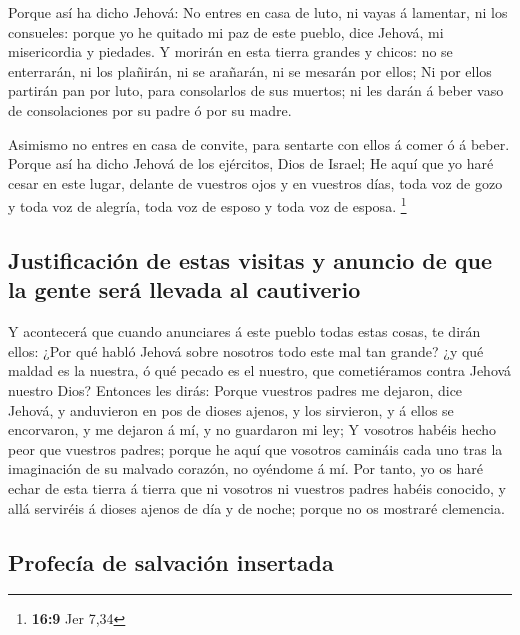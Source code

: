  Porque así ha dicho Jehová: No entres en casa de luto, ni
vayas á lamentar, ni los consueles: porque yo he quitado mi paz de este
pueblo, dice Jehová, mi misericordia y piedades.  Y morirán
en esta tierra grandes y chicos: no se enterrarán, ni los plañirán, ni
se arañarán, ni se mesarán por ellos;  Ni por ellos partirán
pan por luto, para consolarlos de sus muertos; ni les darán á beber vaso
de consolaciones por su padre ó por su madre.

 Asimismo no entres en casa de convite, para sentarte con
ellos á comer ó á beber.  Porque así ha dicho Jehová de los
ejércitos, Dios de Israel; He aquí que yo haré cesar en este lugar,
delante de vuestros ojos y en vuestros días, toda voz de gozo y toda voz
de alegría, toda voz de esposo y toda voz de esposa. \footnote{\textbf{16:9}
  Jer 7,34}

\hypertarget{justificaciuxf3n-de-estas-visitas-y-anuncio-de-que-la-gente-seruxe1-llevada-al-cautiverio}{%
\subsection{Justificación de estas visitas y anuncio de que la gente
será llevada al
cautiverio}\label{justificaciuxf3n-de-estas-visitas-y-anuncio-de-que-la-gente-seruxe1-llevada-al-cautiverio}}

 Y acontecerá que cuando anunciares á este pueblo todas
estas cosas, te dirán ellos: ¿Por qué habló Jehová sobre nosotros todo
este mal tan grande? ¿y qué maldad es la nuestra, ó qué pecado es el
nuestro, que cometiéramos contra Jehová nuestro Dios? 
Entonces les dirás: Porque vuestros padres me dejaron, dice Jehová, y
anduvieron en pos de dioses ajenos, y los sirvieron, y á ellos se
encorvaron, y me dejaron á mí, y no guardaron mi ley;  Y
vosotros habéis hecho peor que vuestros padres; porque he aquí que
vosotros camináis cada uno tras la imaginación de su malvado corazón, no
oyéndome á mí.  Por tanto, yo os haré echar de esta tierra
á tierra que ni vosotros ni vuestros padres habéis conocido, y allá
serviréis á dioses ajenos de día y de noche; porque no os mostraré
clemencia.

\hypertarget{profecuxeda-de-salvaciuxf3n-insertada}{%
\subsection{Profecía de salvación
insertada}\label{profecuxeda-de-salvaciuxf3n-insertada}}

